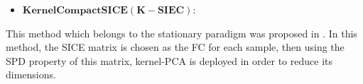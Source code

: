 \documentclass[journal]{IEEEtran}
\begin{document}
	
		
	
	
		
	
	
	
	
	
	
	
	
	\begin{itemize}
		\item $\mathbf{Kernel Compact SICE(K-SIEC):}$ 
	\end{itemize}
	This method which belongs to the stationary paradigm was proposed in \cite{r14}. In this method, the SICE matrix is chosen as the FC for each sample, then using the SPD property of this matrix, kernel-PCA is deployed in order to reduce its dimensions.
\end{document}
